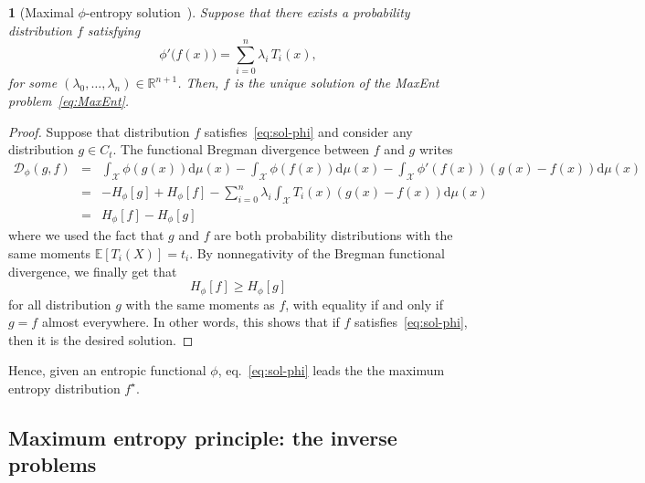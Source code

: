 \documentclass[english,sort&compress]{elsarticle}
\theoremstyle{definition}
\theoremstyle{plain}
\newtheorem{prop}{\protect\propositionname}
\theoremstyle{plain}
\providecommand{\propositionname}{Proposition}
\def\dmu{\mathrm{d}\mu}
\def\fD{\mathcal{D}}
\def\Rset{\mathbb{R}}
\def\X{\mathcal{X}}
\newcommand{\Esp}[1]{\mathbb{E}\left[ #1 \right]}
\begin{document}
\begin{prop}[Maximal $\phi$-entropy solution~\cite{VigHer04, Ber08, BerGir15}]\label{prop:sol-phi}
  Suppose  that  there exists  a  probability  distribution  $f$ satisfying
  \begin{equation}\label{eq:sol-phi}
    \phi'\big(f(x)\big) = \sum_{i=0}^n \lambda_i \, T_i(x),
  \end{equation}
  for  some $(\lambda_0,\ldots,\lambda_n)  \in \Rset^{n+1}$.   Then, $f$  is the
  unique solution of the MaxEnt problem~\eqref{eq:MaxEnt}.
\end{prop}
%
\begin{proof}  Suppose that  distribution  $f$ satisfies~\eqref{eq:sol-phi}  and
  consider  any distribution  $g  \in C_t$.  The  functional Bregman  divergence
  between $f$ and $g$ writes
  \begin{eqnarray*}
  \fD_\phi(g,f) & = & \int_\X \phi(g(x)) \dmu(x) - \int_\X \phi(f(x)) \dmu(x) -
  \int_\X \phi'(f(x)) \left( g(x) - f(x) \right) \dmu(x)
  \\[2mm]
  & = & - H_\phi[g] + H_\phi[f] - \sum_{i=0}^n \lambda_i \int_\X T_i(x) 
\left( g(x) - f(x)  \right) \dmu(x) \\[2mm]
  & = & H_\phi[f] - H_\phi[g]
  \end{eqnarray*}
  where we  used the fact  that $g$ and  $f$ are both  probability distributions
  with the same  moments $\Esp{T_i(X)} = t_i$.  By  nonnegativity of the Bregman
  functional divergence, we finally get that
  \[
  H_\phi[f] \ge H_\phi[g]
  \]
  for all distribution $g$ with the  same moments as $f$, with equality if and
  only if  $g = f$ almost  everywhere.  In other  words, this shows that  if $f$
  satisfies~\eqref{eq:sol-phi}, then it is the desired solution.
\end{proof}

Hence, given an entropic functional $\phi$, eq.~\eqref{eq:sol-phi} leads the the
maximum entropy  distribution $f^\star$.



\subsection{Maximum entropy principle: the inverse problems}

\end{document}
